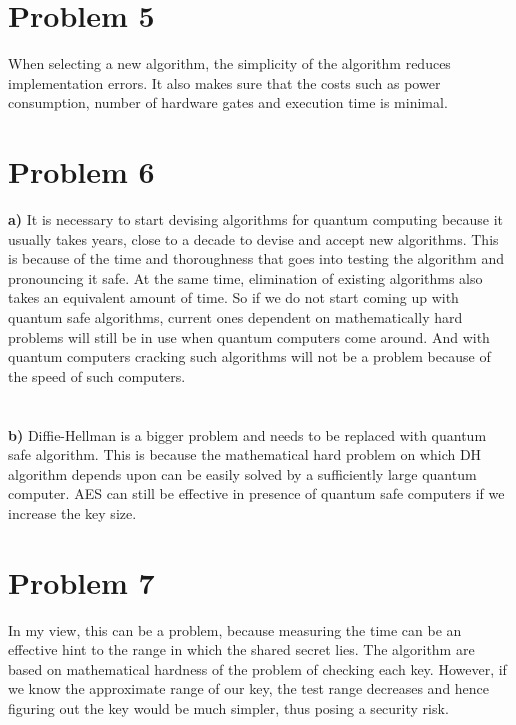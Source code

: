 \documentclass[10pt]{article}
\begin{document}
\section{Problem 5}
When selecting a new algorithm, the simplicity of the algorithm reduces implementation errors. It also makes sure that the costs such as power consumption, number of hardware gates and execution time is minimal.\\
\section{Problem 6}
\textbf{a)} It is necessary to start devising algorithms for quantum computing because it usually takes years, close to a decade to devise and accept new algorithms. This is because of the time and thoroughness that goes into testing the algorithm and pronouncing it safe. At the same time, elimination of existing algorithms also takes an equivalent amount of time.
So if we do not start coming up with quantum safe algorithms, current ones dependent on mathematically hard problems will still be in use when quantum computers come around. And with quantum computers cracking such algorithms will not be a problem because of the speed of such computers.\\\\\\
\textbf{b)} Diffie-Hellman is a bigger problem and needs to be replaced with quantum safe algorithm. This is because the mathematical hard problem on which DH algorithm depends upon can be easily solved by a sufficiently large quantum computer. AES can still be effective in presence of quantum safe computers if we increase the key size.\\
\section{Problem 7}
In my view, this can be a problem, because measuring the time can be an effective hint to the range in which the shared secret lies. The algorithm are based on mathematical hardness of the problem of checking each key. However, if we know the approximate range of our key, the test range decreases and hence figuring out the key would be much simpler, thus posing a security risk.
\end{document}

